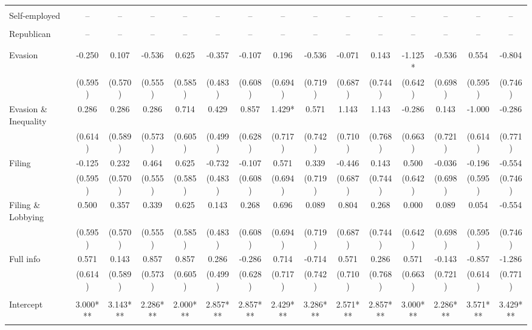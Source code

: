 \documentclass[11pt]{article}
\begin{document}
\begin{landscape}
\begin{table}[!htbp]
\begin{threeparttable}
\begin{tabular}{l||cc|cc|cc|cc|cc||cc||cc}
 &  &  &  &  &  &  &  &  &  &  &  &  &  &  \\
Self-employed & -- & -- & -- & -- & -- & -- & -- & -- & -- & -- & -- & -- & -- & -- \\
 &  &  &  &  &  &  &  &  &  &  &  &  &  &  \\
Republican & -- & -- & -- & -- & -- & -- & -- & -- & -- & -- & -- & -- & -- & -- \\
 &  &  &  &  &  &  &  &  &  &  &  &  &  &  \\
\\[0.5em]
Evasion & -0.250 & 0.107 & -0.536 & 0.625 & -0.357 & -0.107 & 0.196 & -0.536 & -0.071 & 0.143 & -1.125* & -0.536 & 0.554 & -0.804 \\
 & (0.595) & (0.570) & (0.555) & (0.585) & (0.483) & (0.608) & (0.694) & (0.719) & (0.687) & (0.744) & (0.642) & (0.698) & (0.595) & (0.746) \\
Evasion \& Inequality & 0.286 & 0.286 & 0.286 & 0.714 & 0.429 & 0.857 & 1.429* & 0.571 & 1.143 & 1.143 & -0.286 & 0.143 & -1.000 & -0.286 \\
 & (0.614) & (0.589) & (0.573) & (0.605) & (0.499) & (0.628) & (0.717) & (0.742) & (0.710) & (0.768) & (0.663) & (0.721) & (0.614) & (0.771) \\
Filing & -0.125 & 0.232 & 0.464 & 0.625 & -0.732 & -0.107 & 0.571 & 0.339 & -0.446 & 0.143 & 0.500 & -0.036 & -0.196 & -0.554 \\
 & (0.595) & (0.570) & (0.555) & (0.585) & (0.483) & (0.608) & (0.694) & (0.719) & (0.687) & (0.744) & (0.642) & (0.698) & (0.595) & (0.746) \\
Filing \& Lobbying & 0.500 & 0.357 & 0.339 & 0.625 & 0.143 & 0.268 & 0.696 & 0.089 & 0.804 & 0.268 & 0.000 & 0.089 & 0.054 & -0.554 \\
 & (0.595) & (0.570) & (0.555) & (0.585) & (0.483) & (0.608) & (0.694) & (0.719) & (0.687) & (0.744) & (0.642) & (0.698) & (0.595) & (0.746) \\
Full info & 0.571 & 0.143 & 0.857 & 0.857 & 0.286 & -0.286 & 0.714 & -0.714 & 0.571 & 0.286 & 0.571 & -0.143 & -0.857 & -1.286 \\
 & (0.614) & (0.589) & (0.573) & (0.605) & (0.499) & (0.628) & (0.717) & (0.742) & (0.710) & (0.768) & (0.663) & (0.721) & (0.614) & (0.771) \\
\\[0.5em]
Intercept & 3.000*** & 3.143*** & 2.286*** & 2.000*** & 2.857*** & 2.857*** & 2.429*** & 3.286*** & 2.571*** & 2.857*** & 3.000*** & 2.286*** & 3.571*** & 3.429*** \\

\end{tabular}
\end{threeparttable}
\end{table}
\end{landscape}
\end{document}
